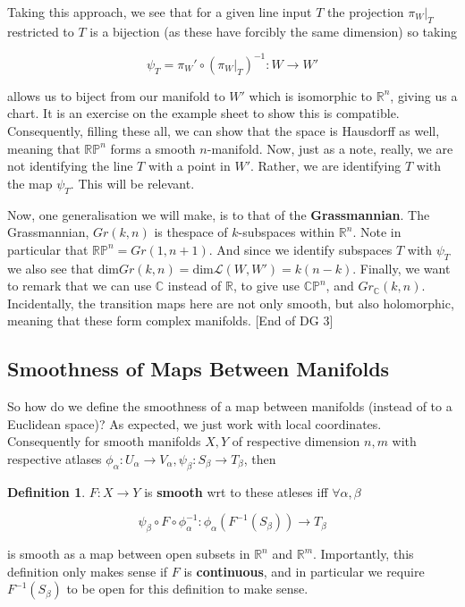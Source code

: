 \documentclass{article}
\theoremstyle{definition}
\newtheorem{definition}{Definition}
\begin{document}
Taking this approach, we see that for a given line input $T$ the projection
$\pi_W |_T$ restricted to $T$ is a bijection (as these have forcibly the same
dimension) so taking

$$ \psi_T = \pi_W' \circ (\pi_W |_T)^{-1} : W \to W' $$

allows us to biject from our manifold to $W'$ which is isomorphic to
$\mathbb{R}^n$, giving us a chart. It is an exercise on the example sheet to
show this is compatible. Consequently, filling these all, we can show that the
space is Hausdorff as well, meaning that $\mathbb{RP}^n$ forms a smooth
$n$-manifold. Now, just as a note, really, we are not identifying the line $T$
with a point in $W'$. Rather, we are identifying $T$ with the map $\psi_T$. This
will be relevant.

Now, one generalisation we will make, is to that of the \textbf{Grassmannian}.
The Grassmannian, $Gr(k, n)$ is thespace of $k$-subspaces within $\mathbb{R}^n$.
Note in particular that $\mathbb{RP}^n = Gr(1, n + 1)$. And since we identify
subspaces $T$ with $\psi_T$ we also see that $\text{dim} Gr(k, n) = \text{dim}
\mathcal{L}(W, W') = k(n - k)$. Finally, we want to remark that we can use
$\mathbb{C}$ instead of $\mathbb{R}$, to give use $\mathbb{CP}^n$, and
$Gr_{\mathbb{C}}(k, n)$. Incidentally, the transition maps here are not only
smooth, but also holomorphic, meaning that these form complex manifolds. [End of
DG 3]

\subsection{Smoothness of Maps Between Manifolds}

So how do we define the smoothness of a map between manifolds (instead of to a
Euclidean space)? As expected, we just work with local coordinates. Consequently
for smooth manifolds $X, Y$ of respective dimension $n, m$ with respective
atlases $\phi_\alpha : U_\alpha \to V_\alpha, \psi_\beta : S_\beta \to T_\beta$,
then 

\begin{definition}
$F: X \to Y$ is \textbf{smooth} wrt to these atleses iff $\forall \alpha, \beta$

$$ \psi_\beta \circ F \circ \phi_\alpha^{-1} : \phi_\alpha(F^{-1}(S_\beta)) \to
T_\beta $$

is smooth as a map between open subsets in $\mathbb{R}^n$ and $\mathbb{R}^m$.
Importantly, this definition only makes sense if $F$ is \textbf{continuous}, and
in particular we require $F^{-1}(S_\beta)$ to be open for this definition to
make sense.
\end{definition}
\end{document}
